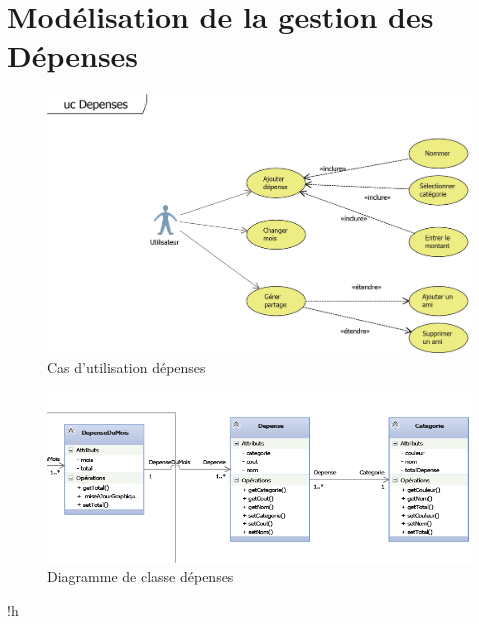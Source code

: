 \documentclass[11pt]{article}
\begin{document}
\section{Modélisation de la gestion des Dépenses}
\begin{figure}[!h]
        \centering \includegraphics[scale=1]{ucDepenses.png}
        \caption{Cas d'utilisation dépenses}
         \label{fig:ucDepenses}
\end{figure}
\begin{figure}[!h]
        \centering \includegraphics[scale=1]{depense.png}
        \caption{Diagramme de classe dépenses}
         \label{fig:depense}
\end{figure}!h

\newpage
\end{document}
